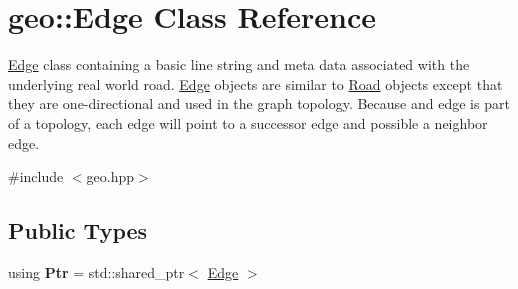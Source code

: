 \hypertarget{classgeo_1_1Edge}{}\section{geo\+:\+:Edge Class Reference}
\label{classgeo_1_1Edge}


\hyperlink{classgeo_1_1Edge}{Edge} class containing a basic line string and meta data associated with the underlying real world road. \hyperlink{classgeo_1_1Edge}{Edge} objects are similar to \hyperlink{classgeo_1_1Road}{Road} objects except that they are one-\/directional and used in the graph topology. Because and edge is part of a topology, each edge will point to a successor edge and possible a neighbor edge.  




{\ttfamily \#include $<$geo.\+hpp$>$}

\subsection*{Public Types}
\begin{DoxyCompactItemize}
\item 
using {\bfseries Ptr} = std\+::shared\+\_\+ptr$<$ \hyperlink{classgeo_1_1Edge}{Edge} $>$\hypertarget{classgeo_1_1Edge_a42cbd37dad3201c3d4386e7e781a260a}{}\label{classgeo_1_1Edge_a42cbd37dad3201c3d4386e7e781a260a}

\end{DoxyCompactItemize}
